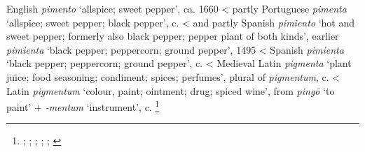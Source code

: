 \begin{etymology}\label{ety:pimento}
English \textit{pimento} `allspice; sweet pepper', ca. 1660
< partly Portuguese \textit{pimenta} `allspice; sweet pepper; black pepper',  c. \AD{}
< and partly Spanish \textit{pimiento} `hot and sweet pepper; formerly also black pepper; pepper plant of both kinds', earlier \textit{pimienta} `black pepper; peppercorn; ground pepper', 1495
< Spanish \textit{pimienta} `black pepper; peppercorn; ground pepper',  c. \AD{}
< Medieval Latin \textit{pigmenta} `plant juice; food seasoning; condiment; spices; perfumes', plural of \textit{pigmentum},  c. \AD{}
< Latin \textit{pigmentum} `colour, paint; ointment; drug; spiced wine', from \textit{pingō} `to paint' + \textit{-mentum} `instrument',  c. \AD{}\footnote{\textcite[s.v. pimento]{oed}; \textcite[s.v. pimento]{oed}; \textcite[s.v. pimiento]{oed}; \textcite[415]{gomez_de_silva_elseviers_1985}; \textcite[495]{corominas_breve_1987}; \textcite[s.v. pigmentum]{lewis_latin_1879}}
\end{etymology}